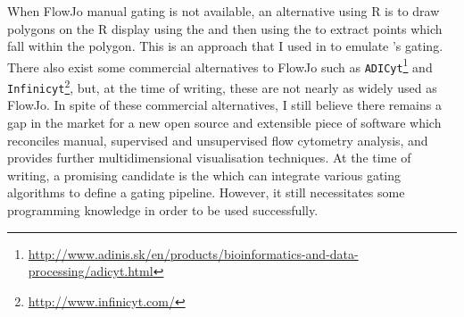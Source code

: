 When FlowJo manual gating is not available, an alternative using R is to draw polygons on the R display using the  and then using the  to extract points which fall within the polygon.
This is an approach that I used in  to emulate 's gating.
There also exist some commercial alternatives to FlowJo  such as \texttt{ADICyt}\footnote{\url{http://www.adinis.sk/en/products/bioinformatics-and-data-processing/adicyt.html}} and \texttt{Infinicyt}\footnote{\url{http://www.infinicyt.com/}}, but, at the time of writing, these are not nearly as widely used as FlowJo.
In spite of these commercial alternatives, I still believe there remains a gap in the market for a new open source and extensible piece of software which reconciles manual, supervised and unsupervised flow cytometry analysis, and provides further multidimensional visualisation techniques.
At the time of writing, a promising candidate is the  which can integrate various gating algorithms to define a gating pipeline.
However, it still necessitates some programming knowledge in order to be used successfully.


%




